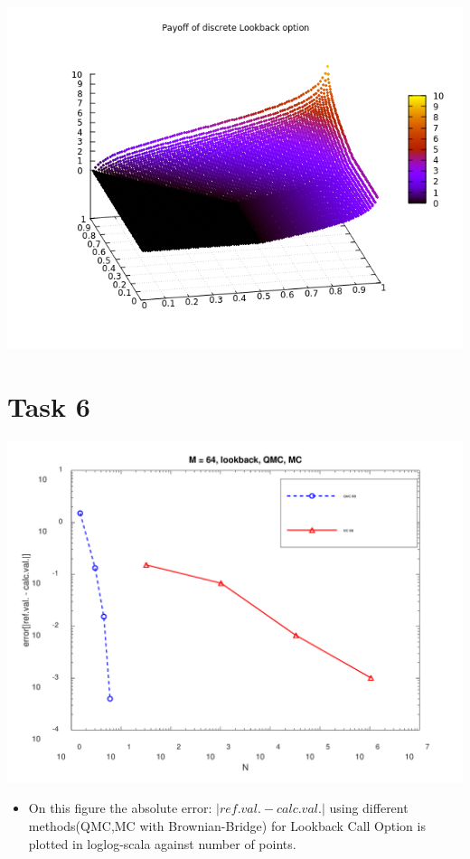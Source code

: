 \documentclass[10pt,a4paper]{article}
\begin{document}
\begin{center}
	\includegraphics[scale=0.4]{images/payoff_lookback.png}
\end{center}

\section*{Task 6}

\begin{center}
	\includegraphics[scale=0.3]{images/task6_error.png}
\end{center}
\begin{itemize}
    \item{
        On this figure the absolute error: $|ref.val.-calc.val.|$ using different methods(QMC,MC with Brownian-Bridge) for Lookback Call Option is plotted in loglog-scala against number of points.
        
    }
     
\end{itemize}
\end{document}
